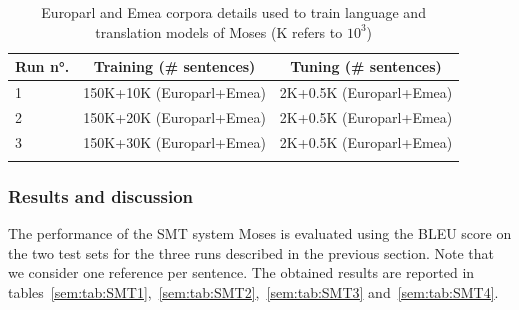 \documentclass[output=paper,modfonts,nonflat]{langsci/langscibook}
\begin{document}
\begin{table}
\caption{Europarl and Emea corpora details used to train language and translation models of Moses (K refers to $10^3$)}
\label{sem:tab:data}
\centering
 \begin{tabular}{lcc} 
  \lsptoprule
  Run n°. & Training (\# sentences) & Tuning (\# sentences) \\
  \midrule
1 & 150K+10K (Europarl+Emea) & 2K+0.5K (Europarl+Emea)\\
2 & 150K+20K (Europarl+Emea) & 2K+0.5K (Europarl+Emea)\\
3 & 150K+30K (Europarl+Emea) & 2K+0.5K (Europarl+Emea)\\
  \lspbottomrule
 \end{tabular}
\end{table}


\subsubsection{Results and discussion}
The performance of the SMT system Moses is evaluated using the BLEU score \citep{papineni2002bleu} on the two test sets for the three runs described in the previous section. 
Note that we consider one reference per sentence. The obtained results are reported in tables~\ref{sem:tab:SMT1},~\ref{sem:tab:SMT2},~\ref{sem:tab:SMT3} and~\ref{sem:tab:SMT4}.

\begin{table}
\caption{BLEU scores of Moses when using the results of the statistical approach}
\label{sem:tab:SMT1}
\end{table}
\end{document}
